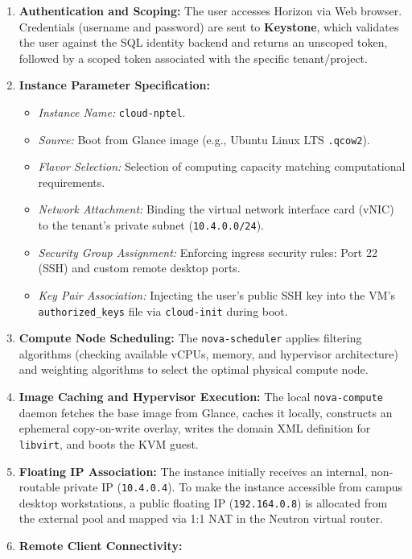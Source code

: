 \documentclass[11pt,a4paper,openany]{report}
\begin{document}
\begin{enumerate}[leftmargin=*]
  \item \textbf{Authentication and Scoping:} The user accesses Horizon via Web browser. Credentials (username and password) are sent to \textbf{Keystone}, which validates the user against the SQL identity backend and returns an unscoped token, followed by a scoped token associated with the specific tenant/project.
  \item \textbf{Instance Parameter Specification:}
    \begin{itemize}
      \item \emph{Instance Name:} \texttt{cloud-nptel}.
      \item \emph{Source:} Boot from Glance image (e.g., Ubuntu Linux LTS \texttt{.qcow2}).
      \item \emph{Flavor Selection:} Selection of computing capacity matching computational requirements.
      \item \emph{Network Attachment:} Binding the virtual network interface card (vNIC) to the tenant's private subnet (\texttt{10.4.0.0/24}).
      \item \emph{Security Group Assignment:} Enforcing ingress security rules: Port 22 (SSH) and custom remote desktop ports.
      \item \emph{Key Pair Association:} Injecting the user's public SSH key into the VM's \texttt{authorized\_keys} file via \texttt{cloud-init} during boot.
    \end{itemize}
  \item \textbf{Compute Node Scheduling:} The \texttt{nova-scheduler} applies filtering algorithms (checking available vCPUs, memory, and hypervisor architecture) and weighting algorithms to select the optimal physical compute node.
  \item \textbf{Image Caching and Hypervisor Execution:} The local \texttt{nova-compute} daemon fetches the base image from Glance, caches it locally, constructs an ephemeral copy-on-write overlay, writes the domain XML definition for \texttt{libvirt}, and boots the KVM guest.
  \item \textbf{Floating IP Association:} The instance initially receives an internal, non-routable private IP (\texttt{10.4.0.4}). To make the instance accessible from campus desktop workstations, a public floating IP (\texttt{192.164.0.8}) is allocated from the external pool and mapped via 1:1 NAT in the Neutron virtual router.
  \item \textbf{Remote Client Connectivity:}

\end{enumerate}
\end{document}
